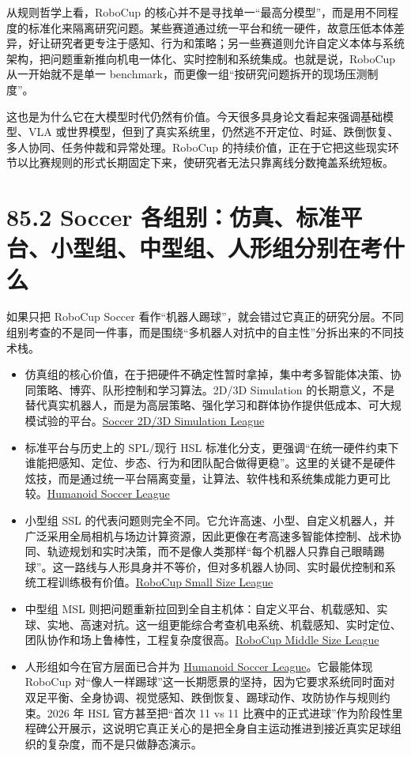 从规则哲学上看，RoboCup 的核心并不是寻找单一“最高分模型”，而是用不同程度的标准化来隔离研究问题。某些赛道通过统一平台和统一硬件，故意压低本体差异，好让研究者更专注于感知、行为和策略；另一些赛道则允许自定义本体与系统架构，把问题重新推向机电一体化、实时控制和系统集成。也就是说，RoboCup 从一开始就不是单一 benchmark，而更像一组“按研究问题拆开的现场压测制度”。

这也是为什么它在大模型时代仍然有价值。今天很多具身论文看起来强调基础模型、VLA 或世界模型，但到了真实系统里，仍然逃不开定位、时延、跌倒恢复、多人协同、任务仲裁和异常处理。RoboCup 的持续价值，正在于它把这些现实环节以比赛规则的形式长期固定下来，使研究者无法只靠离线分数掩盖系统短板。

\section*{85.2 Soccer 各组别：仿真、标准平台、小型组、中型组、人形组分别在考什么}


如果只把 RoboCup Soccer 看作“机器人踢球”，就会错过它真正的研究分层。不同组别考查的不是同一件事，而是围绕“多机器人对抗中的自主性”分拆出来的不同技术栈。

\begin{itemize}
\item 仿真组的核心价值，在于把硬件不确定性暂时拿掉，集中考多智能体决策、协同策略、博弈、队形控制和学习算法。2D/3D Simulation 的长期意义，不是替代真实机器人，而是为高层策略、强化学习和群体协作提供低成本、可大规模试验的平台。\href{https://ssim.robocup.org/}{Soccer 2D/3D Simulation League}
\item 标准平台与历史上的 SPL/现行 HSL 标准化分支，更强调“在统一硬件约束下谁能把感知、定位、步态、行为和团队配合做得更稳”。这里的关键不是硬件炫技，而是通过统一平台隔离变量，让算法、软件栈和系统集成能力更可比较。\href{https://hsl.robocup.org/}{Humanoid Soccer League}
\item 小型组 SSL 的代表问题则完全不同。它允许高速、小型、自定义机器人，并广泛采用全局相机与场边计算资源，因此更像在考高速多智能体控制、战术协同、轨迹规划和实时决策，而不是像人类那样“每个机器人只靠自己眼睛踢球”。这一路线与人形具身并不等价，但对多机器人协同、实时最优控制和系统工程训练极有价值。\href{https://ssl.robocup.org/}{RoboCup Small Size League}
\item 中型组 MSL 则把问题重新拉回到全自主机体：自定义平台、机载感知、实球、实地、高速对抗。这一组更能综合考查机电系统、机载感知、实时定位、团队协作和场上鲁棒性，工程复杂度很高。\href{https://msl.robocup.org/}{RoboCup Middle Size League}
\item 人形组如今在官方层面已合并为 \href{https://hsl.robocup.org/}{Humanoid Soccer League}。它最能体现 RoboCup 对“像人一样踢球”这一长期愿景的坚持，因为它要求系统同时面对双足平衡、全身协调、视觉感知、跌倒恢复、踢球动作、攻防协作与规则约束。2026 年 HSL 官方甚至把“首次 11 vs 11 比赛中的正式进球”作为阶段性里程碑公开展示，这说明它真正关心的是把全身自主运动推进到接近真实足球组织的复杂度，而不是只做静态演示。
\end{itemize}

